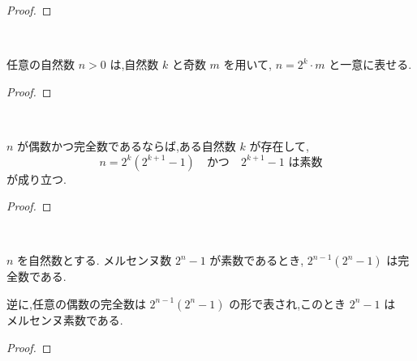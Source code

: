 \begin{proof}

\end{proof}


\begin{lemma}\label{eq_two_pow_mul_odd}\leanok~\

任意の自然数 \(n > 0\) は,自然数 \(k\) と奇数 \(m\) を用いて, \(n = 2^k \cdot m\) と一意に表せる.

\end{lemma}

\begin{proof}

\end{proof}


\begin{theorem}[Euler]\label{eq_two_pow_mul_prime_mersenne_of_even_perfect}
\leanok~\

\(n\) が偶数かつ完全数であるならば,ある自然数 \(k\) が存在して,
\[
n = 2^k (2^{k+1} - 1)
\quad \text{かつ} \quad
2^{k+1} - 1 \text{ は素数}
\]
が成り立つ.

\end{theorem}

\begin{proof}

\end{proof}


\begin{theorem}\label{even_and_perfect_iff}
\leanok~\

\( n \) を自然数とする.
メルセンヌ数 \( 2^n - 1 \) が素数であるとき, \( 2^{n-1}(2^n - 1) \) は完全数である.

逆に,任意の偶数の完全数は \( 2^{n-1}(2^n - 1) \) の形で表され,このとき \( 2^n - 1 \) は\(メルセンヌ\)素数である.

\end{theorem}

\begin{proof}

\end{proof}
